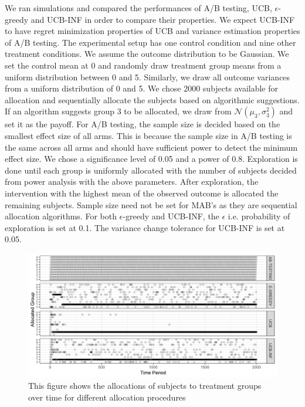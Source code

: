 \documentclass[12pt, letterpaper]{article}
\begin{document}
We ran simulations and compared the performances of A/B testing, UCB, $\epsilon$-greedy and UCB-INF in order to compare their properties. We expect UCB-INF to have regret minimization properties of UCB and variance estimation properties of A/B testing. The experimental setup has one control condition and nine other treatment conditions. We assume the outcome distribution to be Gaussian. We set the control mean at 0 and randomly draw treatment group means from a uniform distribution between 0 and 5. Similarly, we draw all outcome variances from a uniform distribution of 0 and 5. We chose 2000 subjects available for allocation and sequentially allocate the subjects based on algorithmic suggestions. If an algorithm suggests group 3 to be allocated, we draw from $\mathcal{N}(\mu_3,\sigma_3^2)$ and set it as the payoff.
For A/B testing, the sample size is decided based on the smallest effect size of all arms. This is because the sample size in A/B testing is the same across all arms and should have sufficient power to detect the minimum effect size. We chose a significance level of 0.05 and a power of 0.8. Exploration is done until each group is uniformly allocated with the number of subjects decided from power analysis with the above parameters. After exploration, the intervention with the highest mean of the observed outcome is allocated the remaining subjects. Sample size need not be set for MAB's as they are sequential allocation algorithms. For both $\epsilon$-greedy and UCB-INF, the $\epsilon$ i.e. probability of exploration is set at 0.1. The variance change tolerance for UCB-INF is set at 0.05.

\begin{figure}[h]
  \centering
    \includegraphics[width=\textwidth]{figs/group.png}
      \caption{This figure shows the allocations of subjects to treatment groups over time for different allocation procedures}
      \label{group}
\end{figure}
\end{document}

